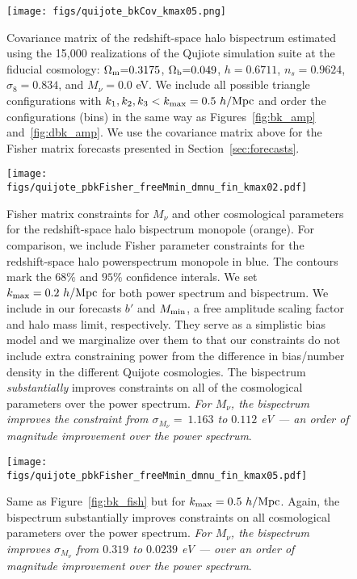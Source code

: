 \documentclass[12pt, letterpaper, preprint]{aastex62}
\newcommand{\Om}{\Omega_{\rm m}}
\newcommand{\Ob}{\Omega_{\rm b}}
\newcommand{\smnu}{M_\nu}
\newcommand{\sig}{\sigma_8}
\begin{document}
\begin{figure}
\begin{center}
    \texttt{[image: figs/quijote\_bkCov\_kmax05.png]} 
    \caption{Covariance matrix of the redshift-space halo bispectrum estimated 
    using the 15,000 realizations of the Qujiote simulation suite at the fiducial 
    cosmology: $\Om{=}0.3175$, $\Ob{=}0.049$, $h{=}0.6711$, $n_s{=}0.9624$, $\sig{=}0.834$, 
    and $\smnu{=}0.0$ eV. We include all possible triangle configurations with 
    $k_1, k_2, k_3 < k_{\rm max} = 0.5~h/{\rm Mpc}$ and order the configurations 
    (bins) in the same way as Figures~\ref{fig:bk_amp} and~\ref{fig:dbk_amp}. We 
    use the covariance matrix above for the Fisher matrix forecasts presented in 
    Section~\ref{sec:forecasts}. 
    }
\label{fig:bk_cov}
\end{center}
\end{figure}

\begin{figure}
\begin{center}
    \texttt{[image: figs/quijote\_pbkFisher\_freeMmin\_dmnu\_fin\_kmax02.pdf]}
    \caption{Fisher matrix constraints for $\smnu$ and other cosmological parameters 
    for the redshift-space halo bispectrum monopole (orange). For comparison, we 
    include Fisher parameter constraints for the redshift-space halo powerspectrum monopole 
    in blue. The contours mark the $68\%$ and $95\%$ confidence interals. We set 
    $k_{\rm max} = 0.2~h/{\rm Mpc}$ for both power spectrum and bispectrum. We 
    include in our forecasts $b'$ and $M_{\rm min}$, a free amplitude scaling factor
    and halo mass limit, respectively. They serve as a simplistic bias model and we 
    marginalize over them to that our constraints do not include extra constraining 
    power from the difference in bias/number density in the different Quijote cosmologies.
    The bispectrum {\em substantially} improves constraints on all of the cosmological parameters 
    over the power spectrum. {\em For $\smnu$, the bispectrum improves the constraint
    from $\sigma_{\smnu}{=}~1.163$ to $0.112$ eV --- an order of magnitude improvement 
    over the power spectrum}.}
\label{fig:bk_fish_02}
\end{center}
\end{figure}

\begin{figure}
\begin{center}
    \texttt{[image: figs/quijote\_pbkFisher\_freeMmin\_dmnu\_fin\_kmax05.pdf]}
    \caption{Same as Figure~\ref{fig:bk_fish} but for $k_{\rm max} = 0.5~h/{\rm Mpc}$.
    Again, the bispectrum substantially improves constraints on all cosmological parameters 
    over the power spectrum. {\em For $\smnu$, the bispectrum improves $\sigma_{\smnu}$ from 
    $0.319$ to $0.0239$ eV --- over an order of magnitude improvement over the power spectrum}.}
\label{fig:bk_fish_05}
\end{center}
\end{figure}
\end{document}
